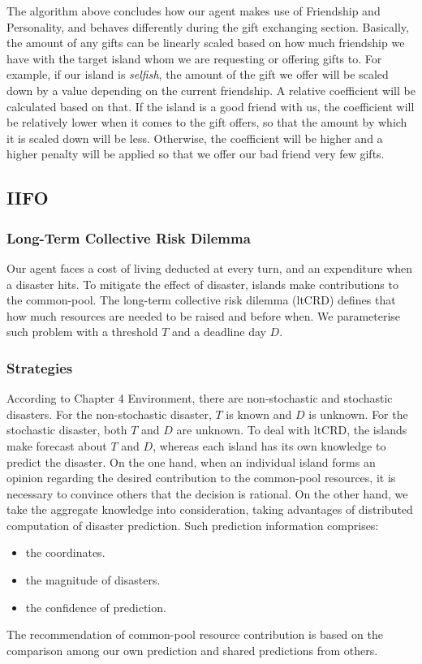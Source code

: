 The algorithm above concludes how our agent makes use of Friendship and Personality, and behaves differently during the gift exchanging section. Basically, the amount of any gifts can be linearly scaled based on how much friendship we have with the target island whom we are requesting or offering gifts to. For example, if our island is \emph{selfish}, the amount of the gift we offer will be scaled down by a value depending on the current friendship. A relative coefficient will be calculated based on that. If the island is a good friend with us, the coefficient will be relatively lower when it comes to the gift offers, so that the amount by which it is scaled down will be less. Otherwise, the coefficient will be higher and a higher penalty will be applied so that we offer our bad friend very few gifts.

\subsection{IIFO} \label{subsec:Team6_IIFO}
\subsubsection{Long-Term Collective Risk Dilemma} \label{subsubsec:Team6_IIFO:ltCRD}
Our agent faces a cost of living deducted at every turn, and an expenditure when a disaster hits. To mitigate the effect of disaster, islands make contributions to the common-pool. The long-term collective risk dilemma (ltCRD) defines that how much resources are needed to be raised and before when. We parameterise such problem with a threshold $T$ and a deadline day $D$.


\subsubsection{Strategies} \label{subsubsec:Team6_IIFO:Strategies}
According to Chapter 4 Environment, there are non-stochastic and stochastic disasters. For the non-stochastic disaster, $T$ is known and $D$ is unknown. For the stochastic disaster, both $T$ and $D$ are unknown. To deal with ltCRD, the islands make forecast about $T$ and $D$, whereas each island has its own knowledge to predict the disaster. On the one hand, when an individual island forms an opinion regarding the desired contribution to the common-pool resources, it is necessary to convince others that the decision is rational. On the other hand, we take the aggregate knowledge into consideration, taking advantages of distributed computation of disaster prediction. Such prediction information comprises:
\begin{itemize}
    \item the coordinates.
    \item the magnitude of disasters.
    \item the confidence of prediction.
\end{itemize}
The recommendation of common-pool resource contribution is based on the comparison among our own prediction and shared predictions from others. 

